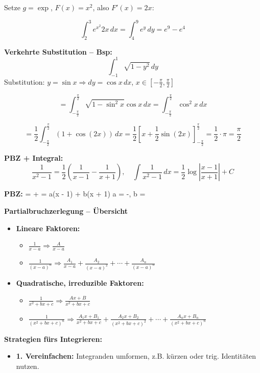 \begin{itemize}
Setze $g = \exp$, $F(x) = x^2$, also $F'(x) = 2x$:

\[
\int_2^3 e^{x^2} 2x\, dx = \int_{4}^{9} e^y\, dy = e^9 - e^4
\]

\textbf{Verkehrte Substitution – Bsp:}
\[
\int_{-1}^{1} \sqrt{1 - y^2} \, dy
\]
Substitution: \( y = \sin x \Rightarrow dy = \cos x \, dx \), \( x \in \left[-\tfrac{\pi}{2}, \tfrac{\pi}{2}\right] \)

\[
= \int_{-\frac{\pi}{2}}^{\frac{\pi}{2}} \sqrt{1 - \sin^2 x} \cos x \, dx = \int_{-\frac{\pi}{2}}^{\frac{\pi}{2}} \cos^2 x \, dx
\]

\[
= \frac{1}{2} \int_{-\frac{\pi}{2}}^{\frac{\pi}{2}} (1 + \cos(2x)) \, dx = \frac{1}{2} \left[ x + \frac{1}{2} \sin(2x) \right]_{-\frac{\pi}{2}}^{\frac{\pi}{2}} = \frac{1}{2} \cdot \pi = \frac{\pi}{2}
\]

\textbf{PBZ + Integral:}  
\[
\frac{1}{x^2 - 1} = \frac{1}{2} \left( \frac{1}{x - 1} - \frac{1}{x + 1} \right), \quad
\int \frac{1}{x^2 - 1} \, dx = \frac{1}{2} \log\left| \frac{x - 1}{x + 1} \right| + C
\]

\textbf{PBZ:} \quad
{} =  +  
 = a(x - 1) + b(x + 1) 
\Rightarrow a = -,\; b = 

\textbf{Partialbruchzerlegung – Übersicht}

\begin{itemize}
  \item \textbf{Lineare Faktoren:}
    \begin{itemize}
      \item \( \frac{1}{x - a} \Rightarrow \frac{A}{x - a} \)
      \item \( \frac{1}{(x - a)^n} \Rightarrow \frac{A_1}{x - a} + \frac{A_2}{(x - a)^2} + \cdots + \frac{A_n}{(x - a)^n} \)
    \end{itemize}
    
  \item \textbf{Quadratische, irreduzible Faktoren:}
    \begin{itemize}
      \item \( \frac{1}{x^2 + bx + c} \Rightarrow \frac{Ax + B}{x^2 + bx + c} \)
      \item \( \frac{1}{(x^2 + bx + c)^n} \Rightarrow \frac{A_1x + B_1}{x^2 + bx + c} + \frac{A_2x + B_2}{(x^2 + bx + c)^2} + \cdots + \frac{A_nx + B_n}{(x^2 + bx + c)^n} \)
    \end{itemize}
\end{itemize}

\textbf{Strategien fürs Integrieren:}
\begin{itemize}
  \item \textbf{1. Vereinfachen:} Integranden umformen, z.B. kürzen oder trig. Identitäten nutzen.
  

\end{itemize}
\end{itemize}
